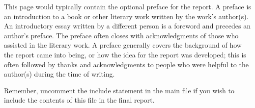 \begin{preface}
	This page would typically contain the optional preface for the report. A preface is an introduction to a book or other literary work written by the work's author(s). An introductory essay written by a different person is a foreword and precedes an author's preface. The preface often closes with acknowledgments of those who assisted in the literary work. A preface generally covers the background of how the report came into being, or how the idea for the report was developed; this is often followed by thanks and acknowledgments to people who were helpful to the author(s) during the time of writing.
	
	Remember, uncomment the include statement in the main file if you wish to include the contents of this file in the final report.
\end{preface}